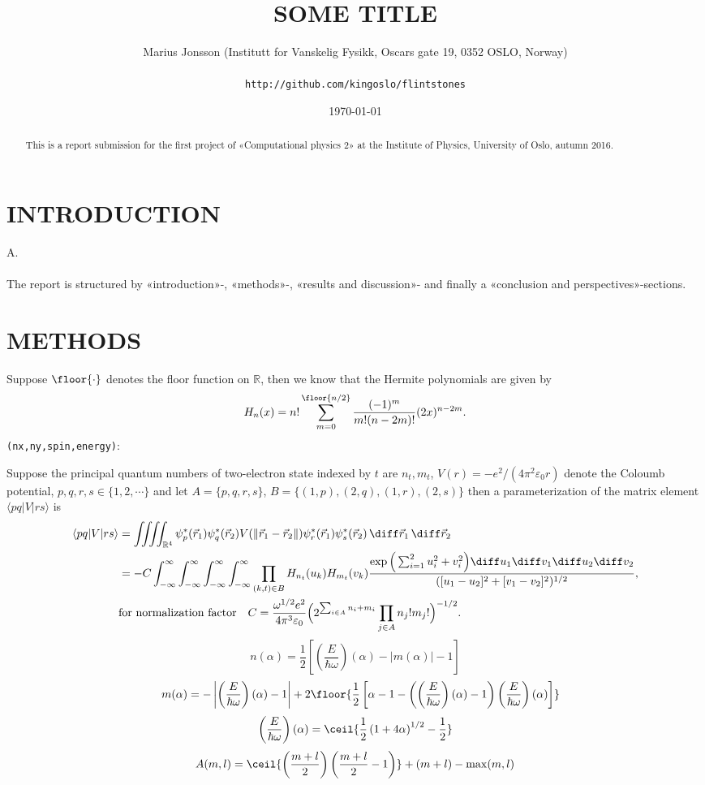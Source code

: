 \documentclass[11pt,english,a4paper]{article}
\author{\normalsize Marius Jonsson (Institutt for Vanskelig Fysikk, Oscars gate 19, 0352 OSLO, Norway) \\\\
\vspace{5px}
\normalsize \texttt{http://github.com/kingoslo/flintstones}}
\title{\bf \uppercase{Some title}}
\date{\normalsize \today}
\begin{document}
\maketitle
\begin{abstract} \normalsize This is a report submission for the first project of «Computational physics 2» at the Institute of Physics, University of Oslo, autumn 2016.
\end{abstract}
\lstset{
  xleftmargin=.2\textwidth, xrightmargin=.2\textwidth
}

\section*{\uppercase{Introduction}}
A.\\
\\
The report is structured by «introduction»-, «methods»-, «results and discussion»- and finally a «conclusion and perspectives»-sections.
\section*{\uppercase{Methods}}
Suppose $\floor{\cdot}$ denotes the floor function on $\mathbb{R}$, then we know that the Hermite polynomials are given by
\[
H_n(x) = n! \sum_{m=0}^{\floor{n/2}} \frac{(-1)^m}{m!(n-2m)!}(2x)^{n-2m}.
\]
\texttt{(nx,ny,spin,energy)}:

Suppose the principal quantum numbers of two-electron state indexed by $t$ are $n_t,m_t$, $V(r) = -e^2/(4\pi^2\varepsilon_0 r)$ denote the Coloumb potential, $p,q,r,s \in \{1,2,\cdots\}$ and let $A=\{ p,q,r,s \}$, $B = \{(1,p),(2,q),(1,r),(2,s)\}$ then a parameterization of the matrix element $\langle pq | V  |  rs \rangle$ is
\begin{align*}
\langle pq | V  |  rs \rangle &= \iiiint_{\mathbb{R}^4} \psi^*_p(\vec{r}_1)\psi^*_q(\vec{r}_2)V(\| \vec{r}_1-\vec{r}_2 \|)\psi^*_r(\vec{r}_1)\psi^*_s(\vec{r}_2)\,\diff \vec{r}_1 \, \diff \vec{r}_2\\
&= - C \int_{-\infty}^\infty\int_{-\infty}^\infty\int_{-\infty}^\infty\int_{-\infty}^\infty \prod_{(k,t)\in B} H_{n_t}(u_k) H_{m_t}(v_k)\frac{\exp\Big(\sum_{i=1}^2 u_i^2 + v_i^2 \Big)\diff u_1 \diff v_1 \diff u_2 \diff v_2}{([u_1 - u_2]^2 + [v_1 - v_2]^2)^{1/2}}, \\
&\text{for normalization factor} \quad C = \frac{\omega^{1/2} e^2}{4 \pi^3 \varepsilon_0}\Big( 2^{\sum_{i \in A} n_i + m_i}\prod_{j \in A}n_j!m_j! \Big)^{  -1/2}.
\end{align*}
\[
n(\alpha) = \frac{1}{2} \left[ \left(\frac{E}{\hbar \omega} \right)(\alpha) - |m(\alpha)| - 1 \right]\]
\[ \quad m(\alpha) = - \left| \left(\frac{E}{\hbar \omega} \right)(\alpha) - 1 \right| + 2 \floor{ \frac{1}{2}\left[\alpha - 1 - \left( \left(\frac{E}{\hbar \omega} \right)(\alpha) - 1 \right)\left(\frac{E}{\hbar \omega} \right)(\alpha) \right] }
\]
\[
\left(\frac{E}{\hbar \omega} \right)(\alpha) = \ceil{\frac{1}{2}\left( 1 + 4\alpha \right)^{1/2} - \frac{1}{2} }
\]
\[
A(m,l) = \ceil{ \left( \frac{m+l}{2} \right)\left( \frac{m+l}{2} -1 \right) } + (m+l) - \max(m,l)
\]
\end{document}
